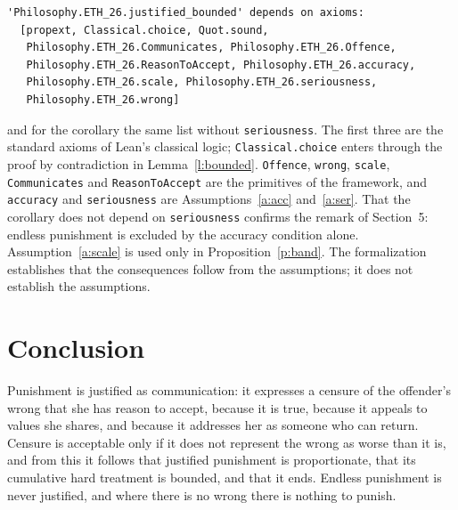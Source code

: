 \documentclass{situationist-preprint}
\begin{document}
\begin{lstlisting}
'Philosophy.ETH_26.justified_bounded' depends on axioms:
  [propext, Classical.choice, Quot.sound,
   Philosophy.ETH_26.Communicates, Philosophy.ETH_26.Offence,
   Philosophy.ETH_26.ReasonToAccept, Philosophy.ETH_26.accuracy,
   Philosophy.ETH_26.scale, Philosophy.ETH_26.seriousness,
   Philosophy.ETH_26.wrong]
\end{lstlisting}

\noindent and for the corollary the same list without \texttt{seriousness}. The first three are the standard axioms of Lean's classical logic; \texttt{Classical.choice} enters through the proof by contradiction in Lemma~\ref{l:bounded}. \texttt{Offence}, \texttt{wrong}, \texttt{scale}, \texttt{Communicates} and \texttt{ReasonToAccept} are the primitives of the framework, and \texttt{accuracy} and \texttt{seriousness} are Assumptions~\ref{a:acc} and~\ref{a:ser}. That the corollary does not depend on \texttt{seriousness} confirms the remark of Section~5: endless punishment is excluded by the accuracy condition alone. Assumption~\ref{a:scale} is used only in Proposition~\ref{p:band}. The formalization establishes that the consequences follow from the assumptions; it does not establish the assumptions.

\section{Conclusion}

Punishment is justified as communication: it expresses a censure of the offender's wrong that she has reason to accept, because it is true, because it appeals to values she shares, and because it addresses her as someone who can return. Censure is acceptable only if it does not represent the wrong as worse than it is, and from this it follows that justified punishment is proportionate, that its cumulative hard treatment is bounded, and that it ends. Endless punishment is never justified, and where there is no wrong there is nothing to punish.
\end{document}
